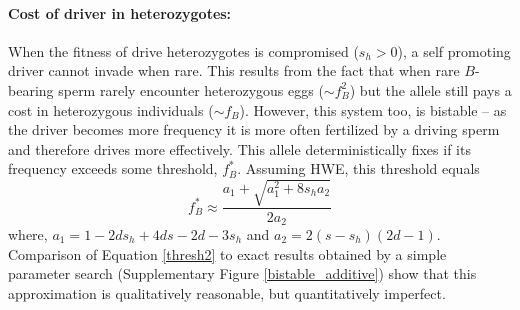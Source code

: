 \documentclass[12pt,letterpaper]{article}
\newcommand{\gc}[1]{{ \color{red} #1}}
\newcommand{\yb}[1]{{ \color{blue} #1}}
\begin{document}
\paragraph{Cost of driver in heterozygotes:} %
When the fitness of drive heterozygotes is compromised ($s_h>0$), a self promoting driver cannot invade when rare.
This results from the fact that
when rare %
$B$-bearing sperm rarely
encounter heterozygous eggs ($\sim f_B^2$) but the allele still pays a
cost in heterozygous individuals ($\sim f_B$). 
However, this system too, is bistable -- as the driver becomes more frequency it is more often fertilized by a driving sperm and therefore drives more effectively.
This allele deterministically fixes if its frequency exceeds some threshold, $f_B^*$.
Assuming HWE, this threshold equals 
\begin{equation}
	f_B^* \approx \frac{a_1+\sqrt{a_1^2+8 s_h a_2}}{2 a_2}
	\label{thresh2}
\end{equation}
where, $a_1=1-2 ds_h+4 d s-2 d-3 s_h$ and $a_2=2(s-s_h)(2d-1)$.
\yb{Comparison of Equation \ref{thresh2} to exact results obtained by a simple parameter search (Supplementary Figure \ref{bistable_additive}) show that this approximation is qualitatively reasonable, but quantitatively imperfect. }
\end{document}
